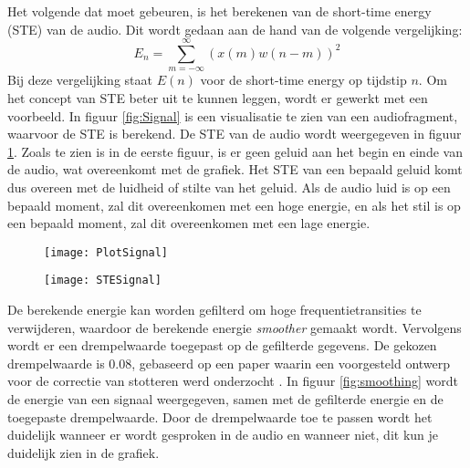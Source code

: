 Het volgende dat moet gebeuren, is het berekenen van de short-time energy (STE) van de audio. Dit wordt gedaan aan de hand van de volgende vergelijking:
\[E_n = \sum_{m=-\infty}^{\infty} (x(m) w(n-m))^2 \]
Bij deze vergelijking staat $E(n)$ voor de short-time energy op tijdstip $n$. Om het concept van STE beter uit te kunnen leggen, wordt er gewerkt met een voorbeeld. In figuur \ref{fig:Signal} is een visualisatie te zien van een audiofragment, waarvoor de STE is berekend. De STE van de audio wordt weergegeven in figuur \ref{fig:STE}. Zoals te zien is in de eerste figuur, is er geen geluid aan het begin en einde van de audio, wat overeenkomt met de grafiek. Het STE van een bepaald geluid komt dus overeen met de luidheid of stilte van het geluid. Als de audio luid is op een bepaald moment, zal dit overeenkomen met een hoge energie, en als het stil is op een bepaald moment, zal dit overeenkomen met een lage energie.
\begin{figure}[H]
    \centering
    \begin{minipage}{.5\textwidth}
        \centering
        \texttt{[image: PlotSignal]}
        \label{fig:Signal}
    \end{minipage}%
    \begin{minipage}{.5\textwidth}
        \centering
        \texttt{[image: STESignal]}
        \label{fig:STE}
    \end{minipage}
\end{figure}
De berekende energie kan worden gefilterd om hoge frequentietransities te verwijderen, waardoor de berekende energie \emph{smoother} gemaakt wordt. Vervolgens wordt er een drempelwaarde toegepast op de gefilterde gegevens. De gekozen drempelwaarde is 0.08, gebaseerd op een paper waarin een voorgesteld ontwerp voor de correctie van stotteren werd onderzocht \autocite{KN2020}. In figuur \ref{fig:smoothing} wordt de energie van een signaal weergegeven, samen met de gefilterde energie en de toegepaste drempelwaarde. Door de drempelwaarde toe te passen wordt het duidelijk wanneer er wordt gesproken in de audio en wanneer niet, dit kun je duidelijk zien in de grafiek. 

